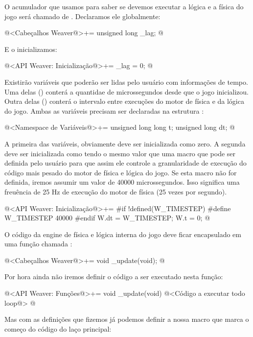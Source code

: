 O acumulador que usamos para saber se devemos executar a lógica e a
física do jogo será chamado de . Declaramos ele
globalmente:

\iniciocodigo
@<Cabeçalhos Weaver@>+=
unsigned long _lag;
@
\fimcodigo

E o inicializamos:

@<API Weaver: Inicialização@>+=
_lag = 0;
@

Existirão variáveis que poderão ser lidas pelo usuário com informações
de tempo. Uma delas () conterá a quantidae de
microssegundos desde que o jogo inicializou. Outra delas
() conterá o intervalo entre execuções do motor de
física e da lógica do jogo. Ambas as variáveis precisam ser declaradas
na estrutura :

\iniciocodigo
@<Namespace de Variáveis@>+=
unsigned long long t;
unsigned long dt;
@
\fimcodigo

A primeira das variáveis, obviamente deve ser inicializada como
zero. A segunda deve ser inicializada como tendo o mesmo valor que uma
macro  que pode ser definida pelo usuário para
que assim ele controle a granularidade de execução do código mais
pesado do motor de física e lógica do jogo. Se esta macro não for
definida, iremos assumir um valor de 40000 microssegundos. Isso
significa uma freuência de 25 Hz de execução do motor de física (25
vezes por segundo).

\iniciocodigo
@<API Weaver: Inicialização@>+=
#if !defined(W_TIMESTEP)
#define W_TIMESTEP 40000
#endif
W.dt = W_TIMESTEP;
W.t = 0;
@
\fimcodigo

O código da engine de física e lógica interna do jogo deve ficar
encapsulado em uma função chamada :

\iniciocodigo
@<Cabeçalhos Weaver@>+=
void _update(void);
@
\fimcodigo

Por hora ainda não iremos definir o código a ser executado nesta
função:

\iniciocodigo
@<API Weaver: Funções@>+=
void _update(void){
  @<Código a executar todo loop@>
}
@
\fimcodigo

Mas com as definições que fizemos já podemos definir a nossa macro que
marca o começo do código do laço principal:

